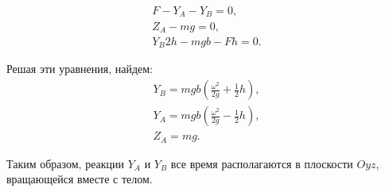 \documentclass[All.tex]{subfiles}
\begin{document}
\begin{eqnarray}\label{freeaxis-eq1}
F -  Y_{A} -  Y_{B} = 0, \\
Z_{A} - mg = 0,\\
Y_{B}2h - mgb-Fh=0.
\end{eqnarray}

Решая эти уравнения, найдем:
\begin{eqnarray}\label{freeaxis-eq2}
Y_{B} = mgb\left(\frac{\omega^{2}}{2g} + \frac{1}{2}h\right), \\
Y_{A} = mgb\left(\frac{\omega^{2}}{2g} - \frac{1}{2}h\right),\\
Z_{A} = mg.
\end{eqnarray}

Таким образом, реакции $ Y_{A} $ и $ Y_{B} $ все время располагаются в плоскости $ Oyz $, вращающейся вместе с телом.
\end{document}
